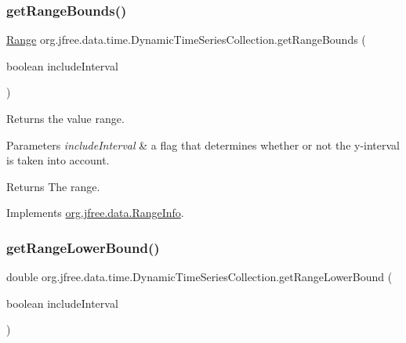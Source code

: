 \subsubsection{\texorpdfstring{get\+Range\+Bounds()}{getRangeBounds()}}
{\footnotesize\ttfamily \mbox{\hyperlink{classorg_1_1jfree_1_1data_1_1_range}{Range}} org.\+jfree.\+data.\+time.\+Dynamic\+Time\+Series\+Collection.\+get\+Range\+Bounds (\begin{DoxyParamCaption}\item[{boolean}]{include\+Interval }\end{DoxyParamCaption})}

Returns the value range.


\begin{DoxyParams}{Parameters}
{\em include\+Interval} & a flag that determines whether or not the y-\/interval is taken into account.\\
\hline
\end{DoxyParams}
\begin{DoxyReturn}{Returns}
The range. 
\end{DoxyReturn}


Implements \mbox{\hyperlink{interfaceorg_1_1jfree_1_1data_1_1_range_info_a2752094d868839b5565131a5bdd8e75e}{org.\+jfree.\+data.\+Range\+Info}}.

\mbox{\label{classorg_1_1jfree_1_1data_1_1time_1_1_dynamic_time_series_collection_a750bce6796644544dc4a084164e8596d}} 
\subsubsection{\texorpdfstring{get\+Range\+Lower\+Bound()}{getRangeLowerBound()}}
{\footnotesize\ttfamily double org.\+jfree.\+data.\+time.\+Dynamic\+Time\+Series\+Collection.\+get\+Range\+Lower\+Bound (\begin{DoxyParamCaption}\item[{boolean}]{include\+Interval }\end{DoxyParamCaption})}

